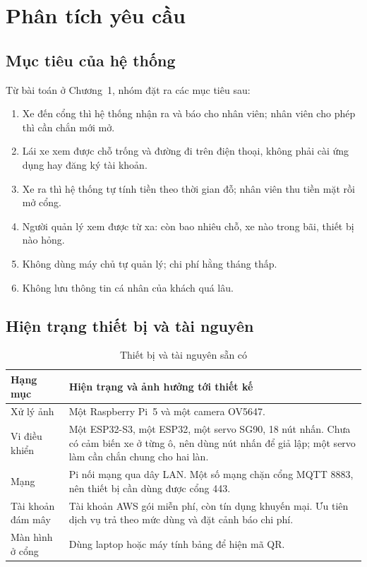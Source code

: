 \chapter{Phân tích yêu cầu}

\section{Mục tiêu của hệ thống}

Từ bài toán ở Chương~1, nhóm đặt ra các mục tiêu sau:

\begin{enumerate}[label=M\arabic*.,leftmargin=1.1cm]
  \item Xe đến cổng thì hệ thống nhận ra và báo cho nhân viên; nhân viên cho phép thì cần chắn mới mở.
  \item Lái xe xem được chỗ trống và đường đi trên điện thoại, không phải cài ứng dụng hay đăng ký tài khoản.
  \item Xe ra thì hệ thống tự tính tiền theo thời gian đỗ; nhân viên thu tiền mặt rồi mở cổng.
  \item Người quản lý xem được từ xa: còn bao nhiêu chỗ, xe nào trong bãi, thiết bị nào hỏng.
  \item Không dùng máy chủ tự quản lý; chi phí hằng tháng thấp.
  \item Không lưu thông tin cá nhân của khách quá lâu.
\end{enumerate}

\section{Hiện trạng thiết bị và tài nguyên}

\begin{table}[H]
\centering
\caption{Thiết bị và tài nguyên sẵn có}
\label{tab:hientrang}
\begin{tabularx}{\textwidth}{@{}P{3.4cm}L@{}}
\toprule
\textbf{Hạng mục} & \textbf{Hiện trạng và ảnh hưởng tới thiết kế} \\ \midrule
Xử lý ảnh & Một Raspberry Pi~5 và một camera OV5647. \\
Vi điều khiển & Một ESP32-S3, một ESP32, một servo SG90, 18 nút nhấn. Chưa có cảm biến xe ở từng ô, nên dùng nút nhấn để giả lập; một servo làm cần chắn chung cho hai làn. \\
Mạng & Pi nối mạng qua dây LAN. Một số mạng chặn cổng MQTT 8883, nên thiết bị cần dùng được cổng 443. \\
Tài khoản đám mây & Tài khoản AWS gói miễn phí, còn tín dụng khuyến mại. Ưu tiên dịch vụ trả theo mức dùng và đặt cảnh báo chi phí. \\
Màn hình ở cổng & Dùng laptop hoặc máy tính bảng để hiện mã QR. \\
\bottomrule
\end{tabularx}
\end{table}

